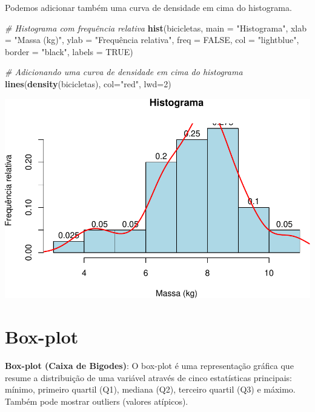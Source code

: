 \documentclass[
]{book}
\newenvironment{Shaded}{\begin{snugshade}}{\end{snugshade}}
\newcommand{\AttributeTok}[1]{\textcolor[rgb]{0.13,0.29,0.53}{#1}}
\newcommand{\CommentTok}[1]{\textcolor[rgb]{0.56,0.35,0.01}{\textit{#1}}}
\newcommand{\ConstantTok}[1]{\textcolor[rgb]{0.56,0.35,0.01}{#1}}
\newcommand{\DecValTok}[1]{\textcolor[rgb]{0.00,0.00,0.81}{#1}}
\newcommand{\FunctionTok}[1]{\textcolor[rgb]{0.13,0.29,0.53}{\textbf{#1}}}
\newcommand{\NormalTok}[1]{#1}
\newcommand{\StringTok}[1]{\textcolor[rgb]{0.31,0.60,0.02}{#1}}
\begin{document}
Podemos adicionar também uma curva de densidade em cima do histograma.

\begin{Shaded}
\begin{Highlighting}[]
\CommentTok{\# Histograma com frequência relativa}
\FunctionTok{hist}\NormalTok{(bicicletas,}
  \AttributeTok{main =} \StringTok{"Histograma"}\NormalTok{,          }
  \AttributeTok{xlab =} \StringTok{"Massa (kg)"}\NormalTok{,          }
  \AttributeTok{ylab =} \StringTok{"Frequência relativa"}\NormalTok{,     }
  \AttributeTok{freq =} \ConstantTok{FALSE}\NormalTok{,}
  \AttributeTok{col =} \StringTok{"lightblue"}\NormalTok{,}
  \AttributeTok{border =} \StringTok{"black"}\NormalTok{,}
  \AttributeTok{labels =} \ConstantTok{TRUE}\NormalTok{)}

\CommentTok{\# Adicionando uma curva de densidade em cima do histograma}
\FunctionTok{lines}\NormalTok{(}\FunctionTok{density}\NormalTok{(bicicletas), }\AttributeTok{col=}\StringTok{"red"}\NormalTok{, }\AttributeTok{lwd=}\DecValTok{2}\NormalTok{)}
\end{Highlighting}
\end{Shaded}

\includegraphics{introR_files/figure-latex/unnamed-chunk-173-1.pdf}

\section{Box-plot}\label{box-plot}

\textbf{Box-plot (Caixa de Bigodes)}: O box-plot é uma representação gráfica
que resume a distribuição de uma variável através de cinco estatísticas
principais: mínimo, primeiro quartil (Q1), mediana (Q2), terceiro
quartil (Q3) e máximo. Também pode mostrar outliers (valores atípicos).
\end{document}
